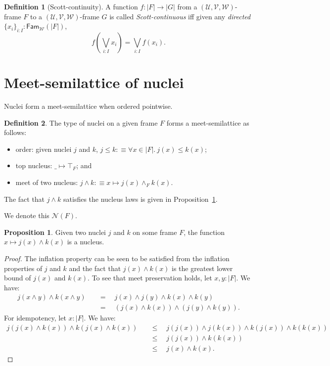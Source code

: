 \documentclass[a4paper, 11pt]{article}
\theoremstyle{definition}
\newtheorem{prop}{Proposition}
\newtheorem{defn}{Definition}
\newcommand{\UU}{\mathcal{U}}
\newcommand{\VV}{\mathcal{V}}
\newcommand{\WW}{\mathcal{W}}
\newcommand{\Fam}[2]{\mathsf{Fam}_{#1}\left(#2\right)}
\newcommand{\define}[1]{\emph{#1}}
\begin{document}
\begin{defn}[Scott-continuity]
  A function $f : | F | \rightarrow | G | $ from a $(\UU, \VV, \WW)$-frame $F$ to a $(\UU, \VV, \WW)$-frame
  $G$ is called \define{Scott-continuous} iff given any \emph{directed}
  $\{ x_i \}_{i : I} : \Fam{\WW}{| F |}$,
  \begin{equation*}
    f\left(\bigvee_{i : I} x_i\right) = \bigvee_{i : I} f(x_i).
  \end{equation*}
\end{defn}

\section{Meet-semilattice of nuclei}

Nuclei form a meet-semilattice when ordered pointwise.

\begin{defn}\label{defn:nuclei-semilattice}
  The type of nuclei on a given frame $F$ forms a meet-semilattice as follows:
  \begin{itemize}
    \item order: given nuclei $j$ and $k$, $j \le k :\equiv \forall x \in | F |.\ j(x) \le k(x)$;
    \item top nucleus: $\_ \mapsto \top_F$; and
    \item meet of two nucleus: $j \wedge k :\equiv x \mapsto j(x) \wedge_F k(x)$.
  \end{itemize}
  The fact that $j \wedge k$ satisfies the nucleus laws is given in Proposition~\ref{prop:nuclei-meet}.
\end{defn}

We denote this $\mathcal{N}(F)$.

\begin{prop}\label{prop:nuclei-meet}
  Given two nuclei $j$ and $k$ on some frame $F$, the function $x \mapsto j(x) \wedge k(x)$ is a nucleus.
\end{prop}
\begin{proof}
  The inflation property can be seen to be satisfied from the inflation properties of $j$ and $k$
  and the fact that $j(x) \wedge k(x)$ is the greatest lower bound of $j(x)$ and $k(x)$. To see that meet
  preservation holds, let $x, y : | F |$. We have:
  \begin{align*}
    j (x \wedge y) \wedge k (x \wedge y) &\quad=\quad j(x) \wedge j(y) \wedge k(x) \wedge k(y) \\
                          &\quad=\quad (j(x) \wedge k(x)) \wedge (j(y) \wedge k(y)).
  \end{align*}
  For idempotency, let $x : | F |$. We have:
  \begin{align*}
    j (j(x) \wedge k(x)) \wedge k(j(x) \wedge k(x)) &\quad\le\quad j(j(x)) \wedge j(k(x)) \wedge k(j(x)) \wedge k(k(x)) \\
                                     &\quad\le\quad j(j(x)) \wedge k(k(x)) & \\
                                     &\quad\le\quad j(x) \wedge k(x).
  \end{align*}
\end{proof}
\end{document}
